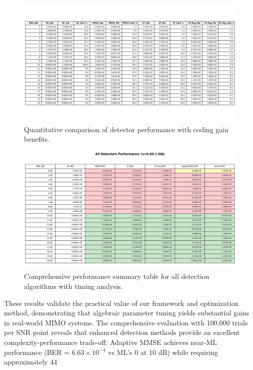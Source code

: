 \begin{figure}[!t]
\centering
\includegraphics[width=0.95\columnwidth]{figures/performance_table.png}
\caption{Quantitative comparison of detector performance with coding gain benefits.}
\label{tab:performance}
\end{figure}

\begin{figure}[!t]
\centering
\includegraphics[width=0.95\columnwidth]{figures/all_detectors_table.png}
\caption{Comprehensive performance summary table for all detection algorithms with timing analysis.}
\label{tab:all_detectors}
\end{figure}

These results validate the practical value of our framework and optimization method, demonstrating that algebraic parameter tuning yields substantial gains in real-world MIMO systems. The comprehensive evaluation with 100,000 trials per SNR point reveals that enhanced detection methods provide an excellent complexity-performance trade-off: Adaptive MMSE achieves near-ML performance (BER = $6.63 \times 10^{-4}$ vs ML's 0 at 10 dB) while requiring approximately 44%
